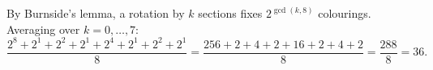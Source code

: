 By Burnside's lemma, a rotation by $k$ sections fixes $2^{\gcd(k,8)}$ colourings. Averaging over $k=0,\dots,7$:
\[
\dfrac{2^8+2^1+2^2+2^1+2^4+2^1+2^2+2^1}{8}=\dfrac{256+2+4+2+16+2+4+2}{8}=\dfrac{288}{8}=\boxed{36}.
\]
